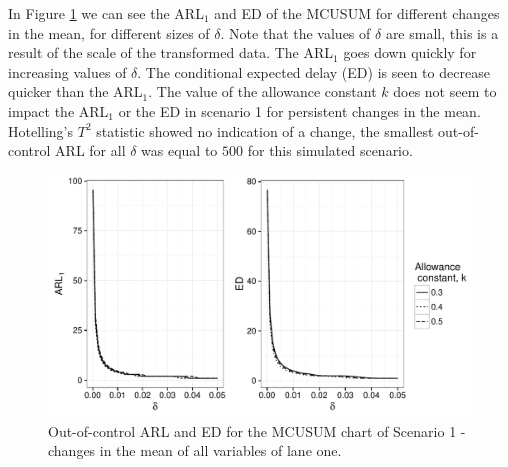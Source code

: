 \documentclass[a4paper,11pt,fleqn,twoside,notitlepage]{report}\usepackage[]{graphicx}\usepackage[]{color}
\makeatletter
\def\maxwidth{ %
  \ifdim\Gin@nat@width>\linewidth
    \linewidth
  \else
    \Gin@nat@width
  \fi
}
\newenvironment{knitrout}{}{} %
\makeatother
\begin{document}
In Figure \ref{fig:ARL1MeanCase1} we can see the ARL$_1$ and ED of the MCUSUM for different changes in the mean, for different sizes of $\delta$. Note that the values of $\delta$ are small, this is a result of the scale of the transformed data. The ARL$_1$ goes down quickly for increasing values of $\delta$. The conditional expected delay (ED) is seen to decrease quicker than the ARL$_1$. The value of the allowance constant $k$ does not seem to impact the ARL$_1$ or the ED in scenario 1 for persistent changes in the mean. Hotelling's $T^2$ statistic showed no indication of a change, the smallest out-of-control ARL for all $\delta$ was equal to $500$ for this simulated scenario.
\begin{knitrout}
\color{fgcolor}\begin{figure}[!ht]
\includegraphics[width=\maxwidth]{figure/ARL1MeanCase1-1} \caption[Out-of-control ARL and ED for the MCUSUM chart of Scenario 1 - changes in the mean of all variables of lane one]{Out-of-control ARL and ED for the MCUSUM chart of Scenario 1 - changes in the mean of all variables of lane one.}\label{fig:ARL1MeanCase1}
\end{figure}


\end{knitrout}
\end{document}
